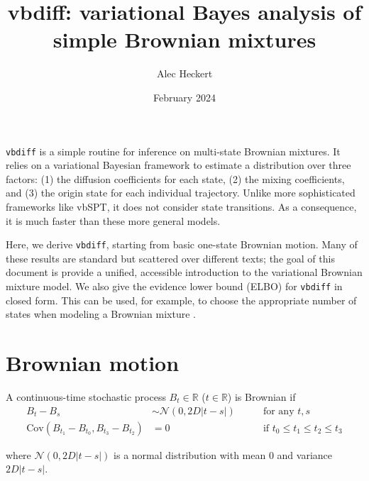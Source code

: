 \documentclass{article}
\begin{document}
\title{vbdiff: variational Bayes analysis of simple Brownian mixtures}
\date{February 2024}
\author{Alec Heckert}
\maketitle

\verb|vbdiff| is a simple routine for inference on multi-state Brownian
mixtures. It relies on a variational Bayesian framework to estimate a distribution
over three factors: (1) the diffusion coefficients for each state, (2) the mixing
coefficients, and (3) the origin state for each individual trajectory.
Unlike more sophisticated frameworks like vbSPT, it does not consider state transitions.
As a consequence, it is much faster than these more general models. \newline

Here, we derive \verb|vbdiff|, starting from basic one-state Brownian motion. Many of these results are standard but scattered over different texts; the goal
of this document is provide a unified, accessible introduction to the variational
Brownian mixture model. We also give the evidence lower bound (ELBO) for
\verb|vbdiff| in closed form. This can be used, for example, to choose the
appropriate number of states when modeling a Brownian mixture \cite{bishop2001}.

\tableofcontents

\section{Brownian motion}\label{section:brownian_motion}

A continuous-time stochastic process $B_{t} \in \mathbb{R}$ ($t \in \mathbb{R}$) is Brownian if
\begin{align}
    B_{t} - B_{s} &\sim \mathcal{N} \left( 0, 2 D \left| t - s \right| \right) \qquad &\text{for any $t, s$} \label{eq:rule1} \\
    \text{Cov} \left( B_{t_{1}} - B_{t_{0}}, B_{t_{3}} - B_{t_{2}} \right) &= 0 \qquad &\text{if $t_{0} \leq t_{1} \leq t_{2} \leq t_{3}$} \label{eq:rule2}
\end{align}

where $\mathcal{N} \left( 0, 2 D \left| t - s \right| \right)$ is a normal distribution
with mean 0 and variance $2 D \left| t - s \right|$. \newline
\end{document}
